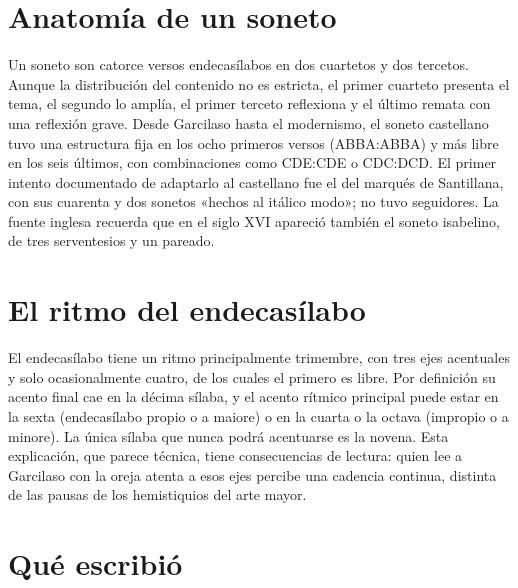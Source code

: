 \documentclass{book}
\begin{document}

\section{Anatomía de un soneto}

Un soneto son catorce versos endecasílabos en dos cuartetos y dos tercetos. Aunque la distribución del contenido no es estricta, el primer cuarteto presenta el tema, el segundo lo amplía, el primer terceto reflexiona y el último remata con una reflexión grave. Desde Garcilaso hasta el modernismo, el soneto castellano tuvo una estructura fija en los ocho primeros versos (ABBA:ABBA) y más libre en los seis últimos, con combinaciones como CDE:CDE o CDC:DCD. El primer intento documentado de adaptarlo al castellano fue el del marqués de Santillana, con sus cuarenta y dos sonetos «hechos al itálico modo»; no tuvo seguidores. La fuente inglesa recuerda que en el siglo XVI apareció también el soneto isabelino, de tres serventesios y un pareado.


\section{El ritmo del endecasílabo}

El endecasílabo tiene un ritmo principalmente trimembre, con tres ejes acentuales y solo ocasionalmente cuatro, de los cuales el primero es libre. Por definición su acento final cae en la décima sílaba, y el acento rítmico principal puede estar en la sexta (endecasílabo propio o a maiore) o en la cuarta o la octava (impropio o a minore). La única sílaba que nunca podrá acentuarse es la novena. Esta explicación, que parece técnica, tiene consecuencias de lectura: quien lee a Garcilaso con la oreja atenta a esos ejes percibe una cadencia continua, distinta de las pausas de los hemistiquios del arte mayor.


\section{Qué escribió}
\end{document}
